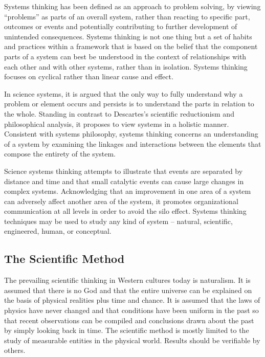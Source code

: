 Systems thinking has been defined as an approach to problem solving, by viewing “problems” as parts of an overall system, rather than reacting to specific part, outcomes or events and potentially contributing to further development of unintended consequences. Systems thinking is not one thing but a set of habits and practices within a framework that is based on the belief that the component parts of a system can best be understood in the context of relationships with each other and with other systems, rather than in isolation. Systems thinking focuses on cyclical rather than linear cause and effect.

In science systems, it is argued that the only way to fully understand why a problem or element occurs and persists is to understand the parts in relation to the whole. Standing in contrast to Descartes’s scientific reductionism and philosophical analysis, it proposes to view systems in a holistic manner. Consistent with systems philosophy, systems thinking concerns an understanding of a system by examining the linkages and interactions between the elements that compose the entirety of the system.

Science systems thinking attempts to illustrate that events are separated by distance and time and that small catalytic events can cause large changes in complex systems. Acknowledging that an improvement in one area of a system can adversely affect another area of the system, it promotes organizational communication at all levels in order to avoid the silo effect. Systems thinking techniques may be used to study any kind of system – natural, scientific, engineered, human, or conceptual.

\subsection{The Scientific Method}

The prevailing scientific thinking in Western cultures today is naturalism. It is assumed that there is no God and that the entire universe can be explained on the basis of physical realities plus time and chance. It is assumed that the laws of physics have never changed and that conditions have been uniform in the past so that recent observations can be compiled and conclusions drawn about the past by simply looking back in time. The scientific method is mostly limited to the study of measurable entities in the physical world. Results should be verifiable by others.

